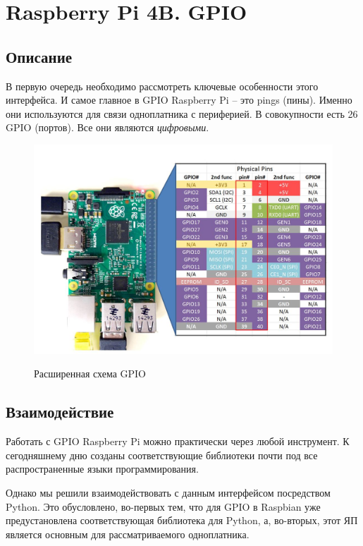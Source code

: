 \documentclass[a4paper, 14pt]{article}
\begin{document}
\newpage
\section{Raspberry Pi 4B. GPIO}

\subsection{Описание}

В первую очередь необходимо рассмотреть ключевые особенности этого интерфейса. И самое главное в GPIO Raspberry Pi – это pings (пины). Именно они используются для связи одноплатника с периферией.
В совокупности есть 26 GPIO (портов). Все они являются \textit{цифровыми}.

\begin{figure}[H]
	\centering
	\includegraphics[width=12cm]{screenshots/999.png}\\
	\caption{Расширенная схема GPIO}
\end{figure}

\subsection{Взаимодействие}

Работать с GPIO Raspberry Pi можно практически через любой инструмент. К сегодняшнему дню созданы соответствующие библиотеки почти под все распространенные языки программирования.

Однако мы решили взаимодействовать с данным интерфейсом посредством Python. Это обусловлено, во-первых тем, что для GPIO в Raspbian уже предустановлена соответствующая библиотека для Python, а, во-вторых, этот ЯП является основным для рассматриваемого одноплатника.
\end{document}
